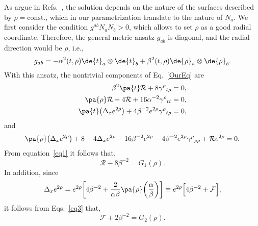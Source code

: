 As argue  in Refs.~\cite{bergmann1965spherically,hawking1973large},  the solution depends on the nature of the surfaces described by $\rho = \text{const.}$, which in our parametrization translate to the nature of $N_a$. We first consider the condition $g^{ab} N_a N_b > 0 $, which allows to set $\rho$ as a good radial coordinate. Therefore, the general metric ansatz $g_{ab}$ is diagonal, and the radial direction would be $\rho$, i.e.,
\begin{equation}
  g_{ab} = - \alpha^2(t,\rho) \de{t}_a \otimes \de{t}_b + \beta^2(t,\rho) \de{\rho}_a \otimes \de{\rho}_b.
  \label{metr2d}
\end{equation}
With this ansatz, the nontrivial components of Eq.~\eqref{OurEq} are
\begin{align}
  \beta^2 \pa{t} \mathcal{R} + 8 \gamma^\rho{}_{t \rho} &= 0,
  \label{eq1}
  \\
  \pa{\rho} \mathcal{R} - 4 \mathcal{R} + 16 \alpha^{-2} \gamma^\rho{}_{tt} &= 0,
  \label{eq2}
  \\
  \pa{t} \big( \Delta_x e^{2\rho} \big) + 4 \beta^{-2} e^{2\rho} \gamma^\rho{}_{t \rho} &= 0,
  \label{eq3}
\end{align}
and
\begin{dmath}
  \pa{\rho} \big( \Delta_x e^{2\rho} \big) + 8 - 4 \Delta_x e^{2\rho} - 16 \beta^{-2} e^{2\rho} - 4 \beta^{-2} e^{2\rho} \gamma^{\rho}{}_{\rho\rho}  + \mathcal{R} e^{2\rho} = 0.
  \label{eq4}
\end{dmath}
From equation~\eqref{eq1} it follows that,
\begin{equation}
  \mathcal{R} - 8 \beta^{-2} = G_1(\rho).
  \label{eq1b}
\end{equation}
In addition, since
\begin{equation}
  \Delta_x e^{2\rho}
  = e^{2\rho} \bigg[ 4 \beta^{-2} + \frac{2}{\alpha \beta} \pa{\rho} \bigg( \frac{\alpha}{\beta} \bigg) \bigg]
  \equiv  e^{2\rho} \Big[ 4 \beta^{-2} + \mathcal{F} \Big],
\end{equation}
it follows from Eqs.~\eqref{eq3} that,
\begin{equation}
  \mathcal{F} + 2 \beta^{-2} = G_2(\rho).
  \label{eq3b}
\end{equation}

